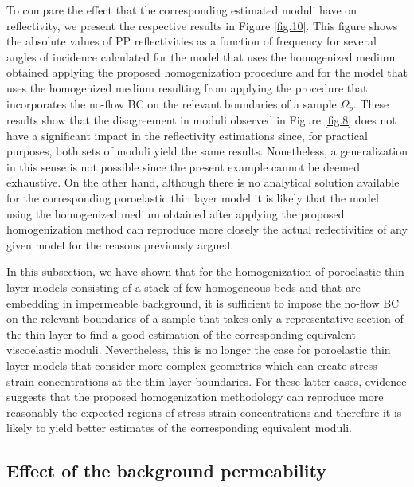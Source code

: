 \documentclass[draft]{agujournal2019}
\begin{document}
To compare the effect that the corresponding estimated moduli have on  reflectivity, we present the respective results in Figure \ref{fig.10}. This figure shows the absolute values of PP reflectivities as a function of frequency for several angles of incidence calculated for the model that uses the homogenized medium obtained applying the proposed homogenization procedure  and for the model that uses the homogenized medium resulting from applying the procedure that incorporates the no-flow BC on the relevant boundaries of a sample $\Omega_p$.  These results show that the disagreement in moduli observed in Figure \ref{fig.8} does not have a significant impact in the reflectivity estimations since, for practical purposes, both sets of moduli yield the same results. Nonetheless, a generalization in this sense is not possible since the present example cannot be deemed exhaustive. On the other hand, although there is no analytical solution available for the corresponding poroelastic thin layer model it is likely that the model using the homogenized medium obtained after applying the proposed homogenization method can reproduce more closely the actual reflectivities of any given model for the reasons previously argued. 

In this subsection, we have shown that for the homogenization of poroelastic thin layer models consisting of a stack of few homogeneous beds and that are embedding in impermeable background, it is sufficient to impose the no-flow BC on the relevant boundaries of a sample that takes only a representative section of the thin layer to find a good estimation of the corresponding equivalent viscoelastic moduli. Nevertheless, this is no longer the case for poroelastic thin layer models that consider more complex geometries which can create stress-strain concentrations at the thin layer boundaries. For these latter cases, evidence suggests that the proposed homogenization methodology can reproduce more reasonably the expected regions of  stress-strain concentrations and therefore it is likely to yield better estimates of the corresponding equivalent moduli.

\subsection{Effect of the background permeability}
\end{document}
